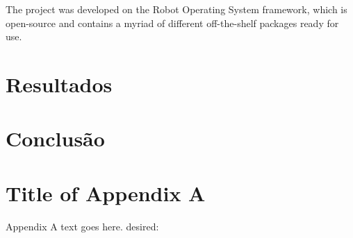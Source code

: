 \documentclass[journal]{IEEEtran}
\begin{document}

The project was developed on the Robot Operating System framework, which is open-source and contains a myriad of different off-the-shelf packages ready for use.

\section{Resultados}

\section{Conclusão}


\appendices
\section{Title of Appendix A}
Appendix A text goes here.
desired:

\end{document}
